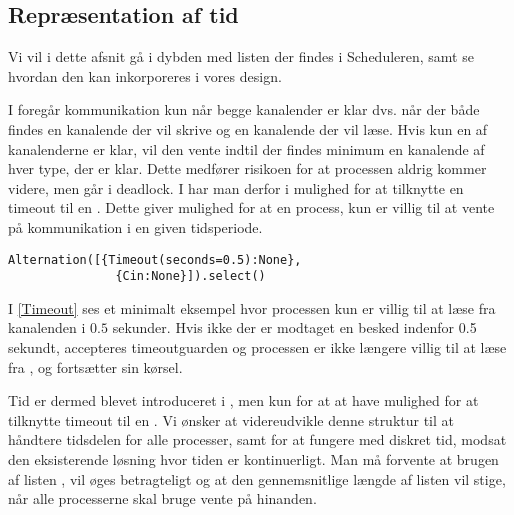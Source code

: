 \subsection{Repræsentation af tid}
Vi vil i dette afsnit gå i dybden med listen  der findes i Scheduleren, samt se hvordan den kan inkorporeres i vores design.

I \pycsp foregår kommunikation kun når begge kanalender er klar dvs.
når der både findes en kanalende der vil skrive og en kanalende der vil læse. 
Hvis kun en af kanalenderne er klar, vil den vente indtil
der findes minimum en kanalende af hver type, der er klar. Dette medfører risikoen for at processen aldrig kommer videre, men går i deadlock. I \pycsp har man derfor i  mulighed for at tilknytte en timeout til en . Dette
giver mulighed for at en process, kun er villig til at vente på kommunikation 
i en given tidsperiode. 
\begin{lstlisting}[float=hbtp, label=Timeout,
  caption=Timeout i Alternation (fra dokumentationen til PyCSP)]
  Alternation([{Timeout(seconds=0.5):None},
               {Cin:None}]).select()
\end{lstlisting} 

I \cref{Timeout} ses et minimalt eksempel hvor processen kun er villig til at læse fra kanalenden  i $0.5$ sekunder. Hvis ikke der er modtaget en besked indenfor 0.5 sekundt, accepteres timeoutguarden og processen er ikke længere villig til at læse fra , og fortsætter sin kørsel.


Tid er dermed blevet introduceret i \pycsp, men kun for at at have mulighed for at tilknytte timeout til en . Vi ønsker at videreudvikle denne struktur til at håndtere tidsdelen for alle processer, samt for at fungere med diskret tid, modsat den eksisterende løsning hvor tiden er kontinuerligt. Man må forvente at brugen af listen , vil øges betragteligt og at den gennemsnitlige længde af listen vil stige, når alle processerne skal bruge vente på hinanden.

